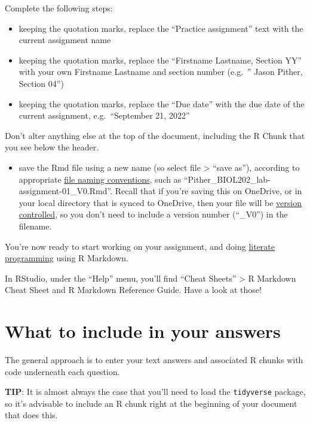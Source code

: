 \documentclass[
]{book}
\providecommand{\tightlist}{%
  \setlength{\itemsep}{0pt}\setlength{\parskip}{0pt}}
\begin{document}
Complete the following steps:

\begin{itemize}
\tightlist
\item
  keeping the quotation marks, replace the ``Practice assignment'' text with the current assignment name\\
\item
  keeping the quotation marks, replace the ``Firstname Lastname, Section YY'' with your own Firstname Lastname and section number (e.g.~'' Jason Pither, Section 04'')
\item
  keeping the quotation marks, replace the ``Due date'' with the due date of the current assignment, e.g.~``September 21, 2022''
\end{itemize}

Don't alter anything else at the top of the document, including the R Chunk that you see below the header.

\begin{itemize}
\tightlist
\item
  save the Rmd file using a new name (so select file \textgreater{} ``save as''), according to appropriate \href{https://ubco-biology.github.io/Procedures-and-Guidelines/file-and-data-management.html}{file naming conventions}, such as ``Pither\_BIOL202\_lab-assignment-01\_V0.Rmd''. Recall that if you're saving this on OneDrive, or in your local directory that is synced to OneDrive, then your file will be \hyperref[onedrive]{version controlled}, so you don't need to include a version number (``\_V0'') in the filename.
\end{itemize}

You're now ready to start working on your assignment, and doing \href{https://ubco-biology.github.io/Procedures-and-Guidelines/glossary.html}{literate programming} using R Markdown.

In RStudio, under the ``Help'' menu, you'll find ``Cheat Sheets'' \textgreater{} R Markdown Cheat Sheet and R Markdown Reference Guide. Have a look at those!

\section{What to include in your answers}\label{what_include_answer}

The general approach is to enter your text answers and associated R chunks with code underneath each question.

\textbf{TIP}: It is almost always the case that you'll need to load the \texttt{tidyverse} package, so it's advisable to include an R chunk right at the beginning of your document that does this.
\end{document}
